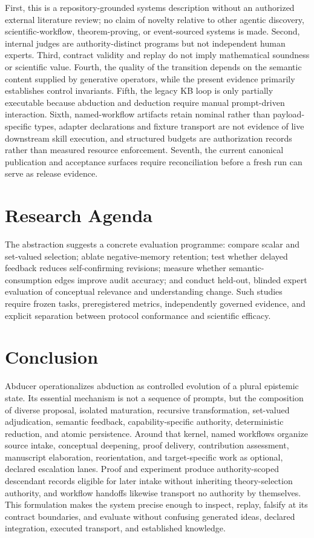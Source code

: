 \documentclass[11pt]{article}
\begin{document}
First, this is a repository-grounded systems description without an authorized external literature review; no claim of novelty relative to other agentic discovery, scientific-workflow, theorem-proving, or event-sourced systems is made. Second, internal judges are authority-distinct programs but not independent human experts. Third, contract validity and replay do not imply mathematical soundness or scientific value. Fourth, the quality of the transition depends on the semantic content supplied by generative operators, while the present evidence primarily establishes control invariants. Fifth, the legacy KB loop is only partially executable because abduction and deduction require manual prompt-driven interaction. Sixth, named-workflow artifacts retain nominal rather than payload-specific types, adapter declarations and fixture transport are not evidence of live downstream skill execution, and structured budgets are authorization records rather than measured resource enforcement. Seventh, the current canonical publication and acceptance surfaces require reconciliation before a fresh run can serve as release evidence.

\section{Research Agenda}

The abstraction suggests a concrete evaluation programme: compare scalar and set-valued selection; ablate negative-memory retention; test whether delayed feedback reduces self-confirming revisions; measure whether semantic-consumption edges improve audit accuracy; and conduct held-out, blinded expert evaluation of conceptual relevance and understanding change. Such studies require frozen tasks, preregistered metrics, independently governed evidence, and explicit separation between protocol conformance and scientific efficacy.

\section{Conclusion}

Abducer operationalizes abduction as controlled evolution of a plural epistemic state. Its essential mechanism is not a sequence of prompts, but the composition of diverse proposal, isolated maturation, recursive transformation, set-valued adjudication, semantic feedback, capability-specific authority, deterministic reduction, and atomic persistence. Around that kernel, named workflows organize source intake, conceptual deepening, proof delivery, contribution assessment, manuscript elaboration, reorientation, and target-specific work as optional, declared escalation lanes. Proof and experiment produce authority-scoped descendant records eligible for later intake without inheriting theory-selection authority, and workflow handoffs likewise transport no authority by themselves. This formulation makes the system precise enough to inspect, replay, falsify at its contract boundaries, and evaluate without confusing generated ideas, declared integration, executed transport, and established knowledge.
\end{document}
